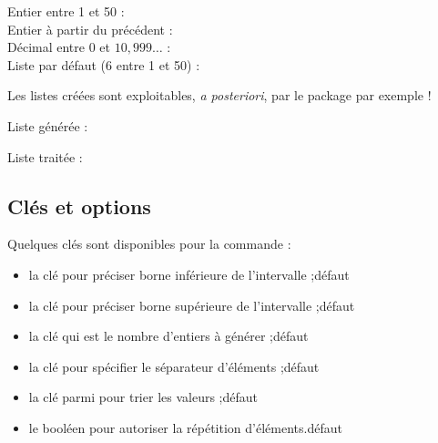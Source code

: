 \begin{PresCodePL}{}
Entier entre 1 et 50 : \PremierNbAlea \\
Entier à partir du précédent : \DeuxiemeNbAlea \\
Décimal entre 0 et $10,999\ldots$ : \PremierDecAlea \\
Liste par défaut (6 entre 1 et 50) : \TirageAleatoireEntiers{\PremiereListeAlea}\PremiereListeAlea
\end{PresCodePL}

\begin{noteblock}
Les listes créées sont exploitables, \textit{a posteriori}, par le package  par exemple !
\end{noteblock}

\begin{PresCodePL}{}
Liste générée : \TirageAleatoireEntiers{\TestListeA}\TestListeA

Liste traitée : \readlist*\LISTEa{\TestListeA}\showitems{\LISTEa}
\end{PresCodePL}

\pagebreak

\subsection{Clés et options}

\begin{cautionblock}
Quelques clés sont disponibles pour la commande  :

\begin{itemize}
	\item la clé  pour préciser borne inférieure de l'intervalle ;\hfill{}défaut 
	\item la clé  pour préciser borne supérieure de l'intervalle ;\hfill{}défaut 
	\item la clé  qui est le nombre d'entiers à générer ;\hfill{}défaut 
	\item la clé  pour spécifier le séparateur d'éléments ;\hfill{}défaut \Cle{,}
	\item la clé  parmi  pour trier les valeurs
	;\hfill{}défaut 
	\item le booléen  pour autoriser la répétition d'éléments.\hfill{}défaut 
\end{itemize}
\vspace*{-\baselineskip}\leavevmode
\end{cautionblock}

